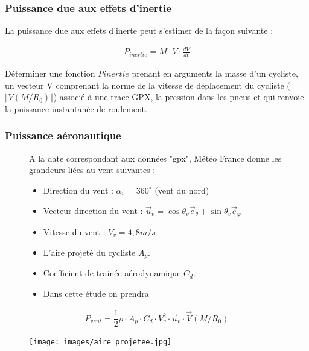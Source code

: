 \FloatBarrier
\subsubsection{Puissance due aux effets d'inertie}

La puissance due aux effets d'inerte peut s'estimer de la façon suivante : 

\begin{align*}
P_{inertie}=M\cdot V\cdot \frac{dV}{dt}
\end{align*}

\question{} Déterminer une fonction $Pinertie$ prenant en arguments la masse d'un cycliste, un vecteur V comprenant la norme de la vitesse de déplacement du cycliste ($\Vert V(M/R_0)\Vert$) associé à une trace GPX, la pression dans les pneus et qui renvoie la puissance instantanée de roulement.

\subsubsection{Puissance aéronautique}


\begin{figure}[!htb]
\begin{minipage}{0.5\textwidth}
A la date correspondant aux données "gpx", Météo France donne les grandeurs liées au vent suivantes :
\begin{itemize}
\item Direction du vent : $\alpha_v=360^{\circ}$ (vent du nord)
\item Vecteur direction du vent : $\overrightarrow{u}_v=\cos\theta_v\overrightarrow{e}_{\theta}+\sin\theta_v\overrightarrow{e}_{\varphi}$
\item Vitesse du vent : $V_v=4,8m/s$
\item L'aire projeté du cycliste $A_p$.
\item Coefficient de trainée aérodynamique $C_d$.
\item Dans cette étude on prendra 
\end{itemize}

\begin{align*}
P_{vent}=\dfrac{1}{2}\rho\cdot A_p\cdot C_d\cdot V_v^2\cdot \overrightarrow{u}_v\cdot \overrightarrow{V}(M/R_0)
\end{align*}
\end{minipage}
\begin{minipage}{0.5\textwidth}
\begin{center}
\texttt{[image: images/aire\_projetee.jpg]}
\end{center}
\end{minipage}
\end{figure}


